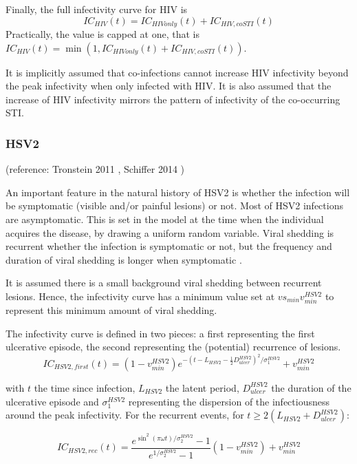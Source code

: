\documentclass[11pt, onecolumn]{article}
\begin{document}
Finally, the full infectivity curve for HIV is
$$ IC_{HIV}(t) = IC_{HIVonly}(t)+IC_{HIV,coSTI}(t)$$
Practically, the value is capped at one, that is $ IC_{HIV}(t) = \min(1,IC_{HIVonly}(t)+IC_{HIV,coSTI}(t))$. 

It is implicitly assumed that co-infections cannot increase HIV infectivity beyond the peak infectivity when only infected with HIV. It is also assumed that the increase of HIV infectivity mirrors the pattern of infectivity of the co-occurring STI.



\subsubsection{HSV2}
(reference: Tronstein 2011 \cite{Tronstein:2011vs}, Schiffer 2014 \cite{xxx})

An important feature in the natural history of HSV2 is whether the infection will be symptomatic (visible and/or painful lesions) or not.
Most of HSV2 infections are asymptomatic. This is set in the model at the time when the individual acquires the disease, by drawing a uniform random variable. Viral shedding is recurrent whether the infection is symptomatic or not, but the frequency and duration of viral shedding is longer when symptomatic \cite{Tronstein:2011vs}. 

It is assumed there is a small background viral shedding between recurrent lesions. Hence, the infectivity curve has a minimum value set at $vs_{min}v_{min}^{HSV2}$ to represent this minimum amount of viral shedding. 

The infectivity curve is defined in two pieces: a first representing the first ulcerative episode, the second representing the (potential) recurrence of lesions.
$$IC_{HSV2,first}(t) = (1-v_{min}^{HSV2})e^{-(t-L_{HSV2}-\frac{1}{2}D_{ulcer}^{HSV2})^2 / \sigma^{HSV2}_1}+v_{min}^{HSV2}$$

with $t$ the time since infection, $L_{HSV2}$ the latent period, $D_{ulcer}^{HSV2}$ the duration of the ulcerative episode and $\sigma^{HSV2}_1$ representing the dispersion of the infectiousness around the peak infectivity.
For the recurrent events, for $t \geq 2(L_{HSV2}+D_{ulcer}^{HSV2})$:

$$ IC_{HSV2,rec}(t) =  \frac{e^{\sin^2(\pi\omega t)/\sigma^{HSV2}_2}-1}{e^{1/\sigma^{HSV2}_2}-1}  (1-v_{min}^{HSV2})+ v_{min}^{HSV2}$$
\end{document}
